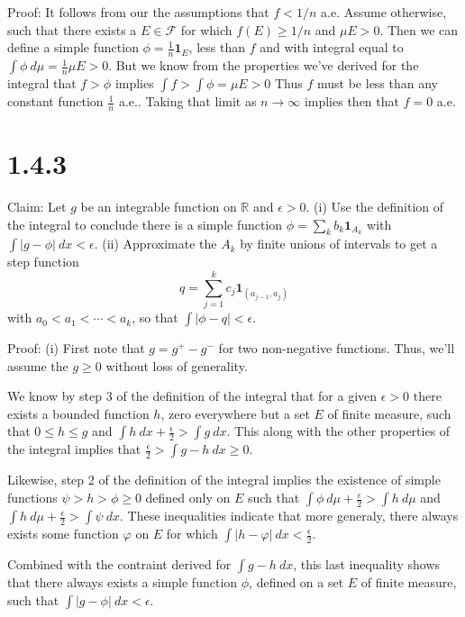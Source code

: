 \documentclass[10pt]{article}
\begin{document}
Proof: It follows from our the assumptions that $f < 1/n$ a.e.
Assume otherwise, such that there exists a $E \in \mathcal{F}$ 
for which $f(E) \ge 1/n$ and $\mu E > 0$. 
Then we can define a simple function $\phi = \frac{1}{n} \mathbf{1}_E$,
less than $f$ and with integral equal to 
$\int \phi\ d \mu = \frac{1}{n} \mu E > 0$.
But we know from the properties we've derived for the integral
that $f > \phi$ implies $\int f > \int \phi = \mu E > 0$
Thus $f$ must be less than any constant function $\frac{1}{n}$ a.e.. 
Taking that limit as $n \to \infty$ implies then that $f = 0$ a.e.

\section*{1.4.3}

Claim: Let $g$ be an integrable function on $\mathbb{R}$
and $\epsilon > 0$. (i) Use the definition of the integral 
to conclude there is a simple function 
$\phi = \sum_k b_k \mathbf{1}_{A_k}$ with
$\int \vert g - \phi \vert \ dx < \epsilon$.
(ii) Approximate the $A_k$ by finite unions of intervals
to get a step function
\begin{equation*}
  q = \sum_{j=1}^k c_j \mathbf{1}_{(a_{j-1}, a_j)}
\end{equation*}
with $a_0 < a_1 < \cdots < a_k$,
so that $\int \vert \phi - q \vert < \epsilon$.

Proof: (i) First note that $g = g^+ - g^-$ for 
two non-negative functions. 
Thus, we'll assume the $g \ge 0$ without
loss of generality.

We know by step 3 of the definition of the integral
that for a given $\epsilon > 0$ there exists
a bounded function $h$, 
zero everywhere but a set $E$ of finite measure,
such that $0 \le h \le g$ and 
$\int h \ dx + \frac{\epsilon}{2} > \int g \ dx$.
This along with the other properties of the integral
implies that $\frac{\epsilon}{2} 
> \int g - h \ dx \ge 0$.

Likewise, step 2 of the definition of the integral
implies the existence of simple functions
$\psi > h > \phi \ge 0$ defined only on $E$
such that $\int \phi \ d\mu 
+ \frac{\epsilon}{2} > \int h \ d\mu$
and $\int h \ d\mu + \frac{\epsilon}{2} > \int \psi \ dx$.
These inequalities indicate that more generaly, 
there always exists some function $\varphi$
on $E$ for which 
$\int \vert h - \varphi \vert \ dx < \frac{\epsilon}{2}$.

Combined with the contraint derived for $\int g - h \ dx$,
this last inequality shows that there always exists
a simple function $\phi$, defined on a set $E$ of finite 
measure, such that $\int \vert g - \phi \vert \ dx < \epsilon$.
\end{document}

